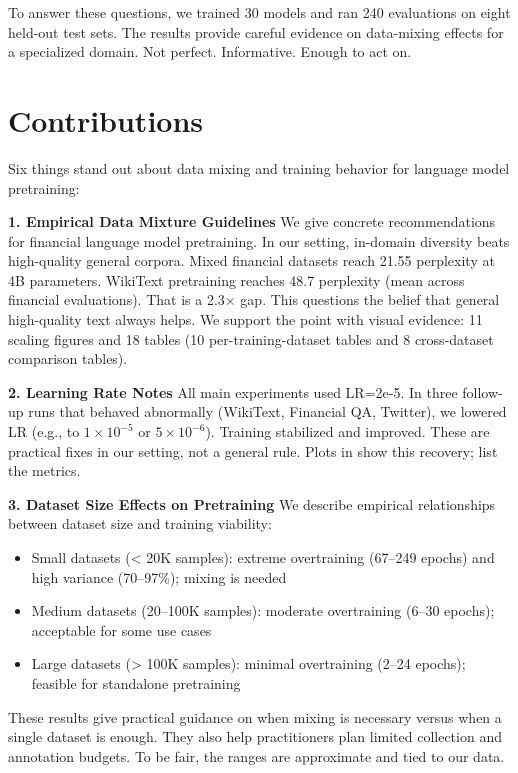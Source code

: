To answer these questions, we trained 30 models and ran 240 evaluations on eight held-out test sets. The results provide careful evidence on data-mixing effects for a specialized domain. Not perfect. Informative. Enough to act on.

\section{Contributions}

Six things stand out about data mixing and training behavior for language model pretraining:

\textbf{1. Empirical Data Mixture Guidelines}
We give concrete recommendations for financial language model pretraining. In our setting, in-domain diversity beats high-quality general corpora. Mixed financial datasets reach 21.55 perplexity at 4B parameters. WikiText pretraining reaches 48.7 perplexity (mean across financial evaluations). That is a 2.3$\times$ gap. This questions the belief that general high-quality text always helps. We support the point with visual evidence: 11 scaling figures and 18 tables (10 per-training-dataset tables and 8 cross-dataset comparison tables).

\textbf{2. Learning Rate Notes}
All main experiments used LR=2e-5. In three follow-up runs that behaved abnormally (WikiText, Financial QA, Twitter), we lowered LR (e.g., to $1\times10^{-5}$ or $5\times10^{-6}$). Training stabilized and improved. These are practical fixes in our setting, not a general rule. Plots in  show this recovery;  list the metrics.

\textbf{3. Dataset Size Effects on Pretraining}
We describe empirical relationships between dataset size and training viability:
\begin{itemize}
    \item Small datasets (< 20K samples): extreme overtraining (67--249 epochs) and high variance (70--97\%); mixing is needed
    \item Medium datasets (20--100K samples): moderate overtraining (6--30 epochs); acceptable for some use cases
    \item Large datasets (> 100K samples): minimal overtraining (2--24 epochs); feasible for standalone pretraining
\end{itemize}
These results give practical guidance on when mixing is necessary versus when a single dataset is enough. They also help practitioners plan limited collection and annotation budgets. To be fair, the ranges are approximate and tied to our data.

